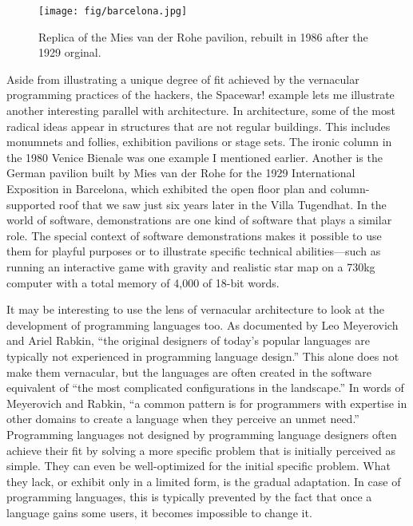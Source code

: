 \begin{figure}
  \centering
  \texttt{[image: fig/barcelona.jpg]}
  \caption{Replica of the Mies van der Rohe pavilion, rebuilt in 1986 after the 1929 orginal.}
  \label{fig:spacewar}
\end{figure}

Aside from illustrating a unique degree of fit achieved by the vernacular programming practices
of the hackers, the Spacewar! example lets me illustrate another interesting parallel with
architecture. In architecture, some of the most radical ideas appear in structures that are not
regular buildings. This includes monumnets and follies, exhibition pavilions or stage sets.
The ironic column in the 1980 Venice Bienale was one example I mentioned earlier. Another is
the German pavilion built by Mies van der Rohe for the 1929 International Exposition in Barcelona,
which exhibited the open floor plan and column-supported roof that we saw just six years later
in the Villa Tugendhat.
In the world of software, demonstrations are one kind of software that plays a similar role.
The special context of software demonstrations makes it possible to use them for playful purposes
or to illustrate specific technical abilities---such as running an interactive game with gravity
and realistic star map on a 730kg computer with a total memory of 4,000 of 18-bit words.


It may be interesting to use the lens of vernacular architecture to look at the development
of programming languages too. As documented by Leo Meyerovich and Ariel Rabkin,
``the original designers of today’s popular languages are typically not experienced in programming
language design.''
This alone does not make them vernacular, but the languages are often created in the
software equivalent of ``the most complicated configurations in the landscape.''
In words of Meyerovich and Rabkin, ``a common pattern is for programmers with expertise in other
domains to create a language when they perceive an unmet need.''
Programming languages not designed by programming language designers often achieve their
fit by solving a more specific problem that is initially perceived as simple. They can even be
well-optimized for the initial specific problem. What they lack, or exhibit only in a limited
form, is the gradual adaptation. In case of programming languages, this is typically prevented
by the fact that once a language gains some users, it becomes impossible to change it.

